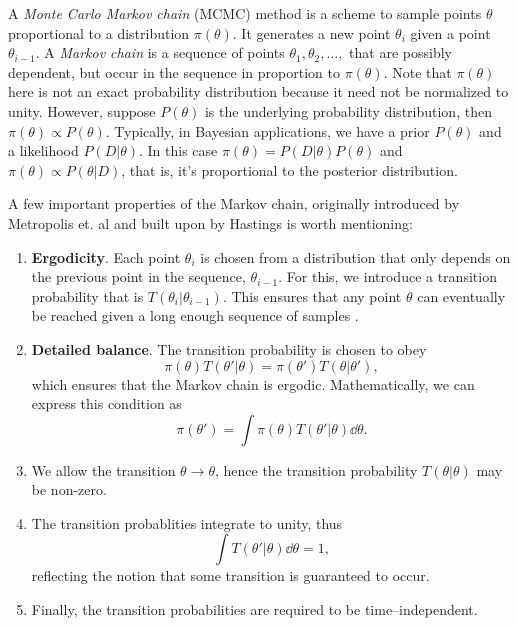 A \textit{Monte Carlo Markov chain} (MCMC) method is a scheme to sample points $\theta$ proportional to a distribution $\pi(\theta)$. It generates a new point $\theta_i$ given a point $\theta_{i-1}$. 
A \textit{Markov chain} is a sequence of points $\theta_1, \theta_2, \ldots,$ that are possibly dependent, but occur in the sequence in proportion to $\pi(\theta)$. Note that $\pi(\theta)$ here is not an exact probability distribution because it need not be normalized to unity.
However, suppose $P(\theta)$ is the underlying probability distribution, then $\pi(\theta) \propto P(\theta)$. Typically, in Bayesian applications, we have a prior $P(\theta)$ and a likelihood $P(D|\theta)$. In this case $\pi(\theta) = P(D|\theta)P(\theta)$ and 
$\pi(\theta) \propto P(\theta|D)$, that is, it's proportional to the posterior distribution.


A few important properties of the Markov chain, originally introduced by Metropolis et. al and built upon by Hastings \cite{metropolis}
is worth mentioning:
\begin{enumerate}
  \item \textbf{Ergodicity}. Each point $\theta_i$ is chosen from a distribution that only depends on the previous point in the sequence, $\theta_{i-1}$. For this, we introduce a transition probability that is  $T(\theta_i|\theta_{i-1})$. This ensures that any point $\theta$ can eventually be reached given a long enough sequence of samples \cite{numerical_recipies}. 
  \item \textbf{Detailed balance}. The transition probability is chosen to obey $$\pi(\theta)T(\theta'|\theta) = \pi(\theta')T(\theta|\theta'),$$ which ensures that the Markov chain is ergodic. Mathematically, we can express this condition as
  $$\pi(\theta') = \int \pi(\theta)T(\theta'|\theta)\dd\theta.$$
  \item We allow the transition $\theta \to \theta$, hence the transition probability $T(\theta|\theta)$ may be non-zero.
  \item The transition probablities integrate to unity, thus $$\int T(\theta'|\theta)\dd\theta = 1,$$
  reflecting the notion that some transition is guaranteed to occur.
  \item Finally, the transition probabilities are required to be time--independent.
\end{enumerate}


